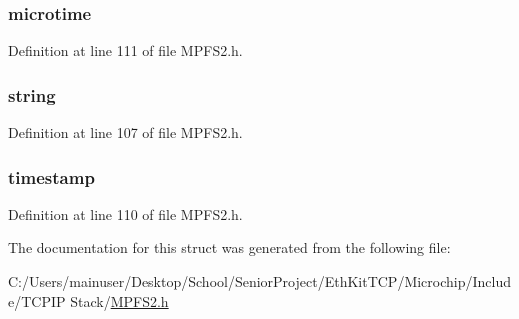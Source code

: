 \subsubsection[{microtime}]{ microtime}\label{struct_m_p_f_s___f_a_t___r_e_c_o_r_d_a413338025f9c8bc53b9287c0871bdff3}


Definition at line 111 of file M\+P\+F\+S2.\+h.

\hypertarget{struct_m_p_f_s___f_a_t___r_e_c_o_r_d_a89ac7b643195c925b1d4225ae4beea7d}{}
\subsubsection[{string}]{ string}\label{struct_m_p_f_s___f_a_t___r_e_c_o_r_d_a89ac7b643195c925b1d4225ae4beea7d}


Definition at line 107 of file M\+P\+F\+S2.\+h.

\hypertarget{struct_m_p_f_s___f_a_t___r_e_c_o_r_d_af4114d4e251326ebdb4638a0bb418bd7}{}
\subsubsection[{timestamp}]{ timestamp}\label{struct_m_p_f_s___f_a_t___r_e_c_o_r_d_af4114d4e251326ebdb4638a0bb418bd7}


Definition at line 110 of file M\+P\+F\+S2.\+h.



The documentation for this struct was generated from the following file\+:\begin{DoxyCompactItemize}
\item 
C\+:/\+Users/mainuser/\+Desktop/\+School/\+Senior\+Project/\+Eth\+Kit\+T\+C\+P/\+Microchip/\+Include/\+T\+C\+P\+I\+P Stack/\hyperlink{_m_p_f_s2_8h}{M\+P\+F\+S2.\+h}\end{DoxyCompactItemize}
